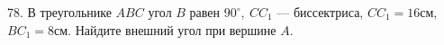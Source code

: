 78. В треугольнике $ABC$ угол $B$ равен $90^\circ,\ CC_1$ --- биссектриса, $CC_1=16$см, $BC_1=8$см. Найдите внешний угол при вершине $A.$\\
